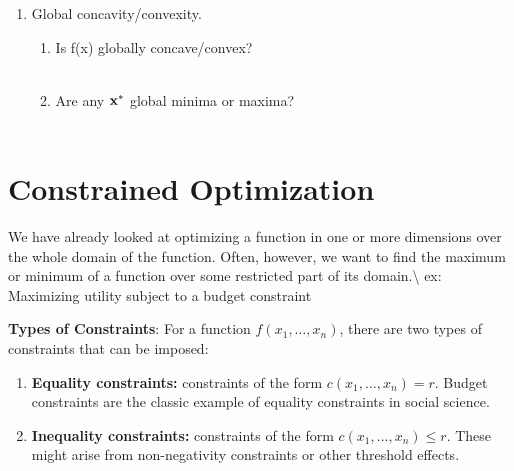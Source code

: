 \documentclass[]{book}
\theoremstyle{definition}
\theoremstyle{definition}
\theoremstyle{definition}
\theoremstyle{remark}
\begin{document}
\begin{enumerate}
  \item Global concavity/convexity.  
    \begin{enumerate}
    \item Is f(x) globally concave/convex?\\
        \\
    \item Are any $\bf x^*$ global minima or maxima?\\
        \\
    \end{enumerate}       
\end{enumerate}

\section{Constrained Optimization}\label{constrained-optimization}

We have already looked at optimizing a function in one or more
dimensions over the whole domain of the function. Often, however, we
want to find the maximum or minimum of a function over some restricted
part of its domain.\textbackslash{} ex: Maximizing utility subject to a
budget constraint

\textbf{Types of Constraints}: For a function \(f(x_1, \dots, x_n)\),
there are two types of constraints that can be imposed:

\begin{enumerate}
\item \textbf{Equality constraints:} constraints of the form $c(x_1,\dots, x_n) = r$.
Budget constraints are the classic example of equality constraints in social science.
\item \textbf{Inequality constraints:} constraints of the form $c(x_1, \dots, x_n) \leq r$.  These might arise from non-negativity constraints or other threshold effects.
\end{enumerate}
\end{document}
